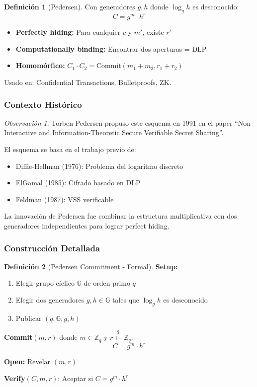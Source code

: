 \documentclass[11pt,a4paper,twoside,openright]{book}
\theoremstyle{definition}
\newtheorem{definition}{Definición}[chapter]
\theoremstyle{plain}
\theoremstyle{remark}
\newtheorem{remark}{Observación}[chapter]
\begin{document}
\begin{definition}[Pedersen]
Con generadores $g, h$ donde $\log_g h$ es desconocido:
\[
C = g^m \cdot h^r
\]
\end{definition}

\begin{itemize}
    \item \textbf{Perfectly hiding:} Para cualquier $c$ y $m'$, existe $r'$
    \item \textbf{Computationally binding:} Encontrar dos aperturas = DLP
    \item \textbf{Homomórfico:} $C_1 \cdot C_2 = \text{Commit}(m_1 + m_2, r_1 + r_2)$
\end{itemize}

Usado en: Confidential Transactions, Bulletproofs, ZK.

\subsubsection{Contexto Histórico}

\begin{remark}
Torben Pedersen propuso este esquema en 1991 en el paper ``Non-Interactive and Information-Theoretic Secure Verifiable Secret Sharing''.

El esquema se basa en el trabajo previo de:
\begin{itemize}
    \item Diffie-Hellman (1976): Problema del logaritmo discreto
    \item ElGamal (1985): Cifrado basado en DLP
    \item Feldman (1987): VSS verificable
\end{itemize}

La innovación de Pedersen fue combinar la estructura multiplicativa con dos generadores independientes para lograr perfect hiding.
\end{remark}

\subsubsection{Construcción Detallada}

\begin{definition}[Pedersen Commitment - Formal]
\textbf{Setup:}
\begin{enumerate}
    \item Elegir grupo cíclico $\mathbb{G}$ de orden primo $q$
    \item Elegir dos generadores $g, h \in \mathbb{G}$ tales que $\log_g h$ es desconocido
    \item Publicar $(q, \mathbb{G}, g, h)$
\end{enumerate}

\textbf{Commit}$(m, r)$ donde $m \in \mathbb{Z}_q$ y $r \xleftarrow{\$} \mathbb{Z}_q$:
\[ C = g^m \cdot h^r \]

\textbf{Open:} Revelar $(m, r)$

\textbf{Verify}$(C, m, r)$: Aceptar si $C = g^m \cdot h^r$
\end{definition}
\end{document}
